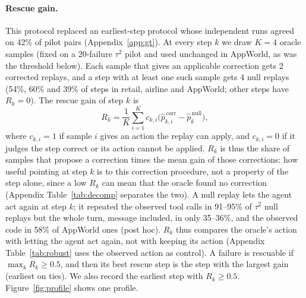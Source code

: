 \documentclass[11pt]{article}
\begin{document}
\paragraph{Rescue gain.} This protocol replaced an earliest-step protocol whose independent runs agreed on 42\% of pilot pairs (Appendix~\ref{app:gt}). At every step $k$ we draw $K=4$ oracle samples (fixed on a 20-failure $\tau^2$ pilot and used unchanged in AppWorld, as was the threshold below). Each sample that gives an applicable correction gets 2 corrected replays, and a step with at least one such sample gets 4 null replays (54\%, 60\% and 39\% of steps in retail, airline and AppWorld; other steps have $R_k=0$). The rescue gain of step $k$ is
\begin{equation}
R_k=\frac{1}{K}\sum_{i=1}^{K}c_{k,i}\bigl(\hat{p}^{\,\mathrm{corr}}_{k,i}-\hat{p}^{\,\mathrm{null}}_{k}\bigr),
\end{equation}
where $c_{k,i}=1$ if sample $i$ gives an action the replay can apply, and $c_{k,i}=0$ if it judges the step correct or its action cannot be applied. $R_k$ is thus the share of samples that propose a correction times the mean gain of those corrections: how useful pointing at step $k$ is to this correction procedure, not a property of the step alone, since a low $R_k$ can mean that the oracle found no correction (Appendix Table~\ref{tab:decomp} separates the two). A null replay lets the agent act again at step $k$; it repeated the observed tool calls in 91--95\% of $\tau^2$ null replays but the whole turn, message included, in only 35--36\%, and the observed code in 58\% of AppWorld ones (post hoc). $R_k$ thus compares the oracle's action with letting the agent act again, not with keeping its action (Appendix Table~\ref{tab:robust} uses the observed action as control). A failure is rescuable if $\max_k R_k\ge 0.5$, and then its best rescue step is the step with the largest gain (earliest on ties). We also record the earliest step with $R_k\ge 0.5$. Figure~\ref{fig:profile} shows one profile.
\end{document}
